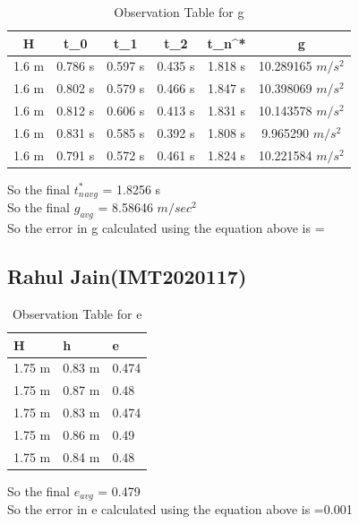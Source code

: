 \documentclass[11pt]{scrartcl} %
\begin{document}
\begin{table}[h]
\centering
\begin{tabular}{||c c c c c c||} 
\toprule
 \hline
 H & t_0 & t_1 & t_2 & t_n^* & g \\ [0.5ex] 
 \midrule
 \hline\hline
 1.6 m & 0.786 s & 0.597 s  & 0.435 s & 1.818 s & 10.289165 $m/s^2$ \\
 \hline
 1.6 m & 0.802 s & 0.579 s & 0.466 s & 1.847 s & 10.398069 $m/s^2$  \\
 \hline
 1.6 m & 0.812 s & 0.606 s & 0.413 s & 1.831 s  & 10.143578 $m/s^2$ \\
 \hline
 1.6 m & 0.831 s & 0.585 s & 0.392 s & 1.808 s  & 9.965290 $m/s^2$  \\
 \hline
 1.6 m & 0.791 s & 0.572 s & 0.461 s & 1.824 s  & 10.221584 $m/s^2$ \\ [1ex]
 \bottomrule
 \hline
\end{tabular}
\caption{Observation Table for g}
\end{table}
So the final $t_n^*_{avg}$ = 1.8256 s\\
So the final $g_{avg}$ = 8.58646 $m/sec^2$\\
So the error in g calculated using the equation above is =
\newpage
\subsection{Rahul Jain(IMT2020117)}

\begin{table}[h] %
	\centering %
	\begin{tabular}{l l l}
		\toprule
		\textbf{H} & \textbf{h} & \textbf{e} \\
		\midrule
		1.75 m & 0.83 m & 0.474\\
        1.75 m & 0.87 m  & 0.48\\
        1.75 m & 0.83 m  & 0.474\\
        1.75 m & 0.86 m & 0.49 \\
        1.75 m & 0.84 m & 0.48 \\
		\bottomrule
	\end{tabular}
	\caption{Observation Table for e}
\end{table}
So the final $e_{avg}$ = 0.479\\
So the error in e calculated using the equation above is =0.001
\end{document}
